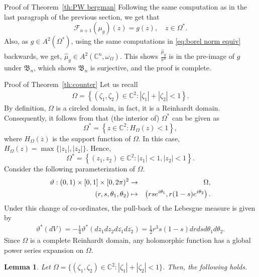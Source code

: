 \documentclass[11pt, oneside, reqno]{amsart}
\numberwithin{equation}{section}
\newtheorem{lemma}[theorem]{Lemma}
\theoremstyle{definition}
\newcommand{\beas}{\begin{eqnarray*}}
\newcommand{\eeas}{\end{eqnarray*}}
\newcommand{\be} {\begin{equation}}
\newcommand{\ee} {\end{equation}}
\newcommand{\bea} {\begin{eqnarray}}
\newcommand{\eea} {\end{eqnarray}}
\newcommand{\C}{\mathbb C}
\newcommand{\N}{\mathbb N}
\newcommand{\F}{\mathcal F}
\newcommand{\ltt}{\left(}
\newcommand{\rtt}{\right)}
\newcommand{\Om}{\Omega}
\begin{document}
{\begin{section}{Proof of Theorem~\ref{th:PW bergman}}
 Following the same computation as in the last paragraph of the previous section, we get that
 \[
 \F_{n+1}(\mu_g)(z)=g(z),\quad z\in \Om^*.
 \]
Also, as $g\in A^2(\Om^*)$, using the same computations in \eqref{eq:borel norm equiv} backwards, we get, $\widehat \mu_g\in A^2(\C^n,\omega_\Om)$. This shows $\frac{\widehat \mu_g}{\pi^n}$ is in the pre-image of $g$ under $\mathfrak B_n$, which shows $\mathfrak B_n$ is surjective, and the proof is complete.   
\end{section}
\begin{section}{Proof of Theorem~\ref{th:counter}}
{
Let us recall \beas
\Om=\left\{(\zeta_1,\zeta_2)\in\C^2: |\zeta_1|+|\zeta_2|<1\right\}.
\eeas
By definition, $\Om$ is a circled domain, in fact, it is a Reinhardt domain. Consequently, it follows from \cite[Proposition~18]{Li02} that (the interior of) $\Om^*$ can be given as }
   \[
   \Om^*=\left\{z\in\C^2: H_\Om(z)<1\right\},
   \]
   {where $H_\Om(\overline z)$ is the support function of $\Om$.} In this case, $H_\Om(z)=\max\{|z_1|,|z_2|\}$. Hence,
$$\Om^*=\left\{\ltt z_1,z_2\rtt\in\C^2: |z_1|<1,|z_2|<1\right\}.$$
Consider the following parameterization of $\Om$. 
\bea
\vartheta:(0,1)\times[0,1]\times [0,2\pi)^2&\rightarrow& \Om,\notag \\
      (r,s,\theta_1,\theta_2)&\mapsto&\ltt rse^{i\theta_1},r(1-s)e^{i\theta_2}\rtt.
      \label{eq:param of diamond}
      \eea
      Under this change of co-ordinates, the pull-back of the Lebesgue measure is given by
      \bea\label{eq:pullback of lbge}
      \vartheta^*\ltt dV\rtt=-\frac{1}{4}\vartheta^*\ltt dz_1 dz_2 d\overline{z_1} d\overline{z_2}\rtt=\frac{1}{2}r^3s(1-s) dr ds d\theta_1 d\theta_2.
      \eea
    Since $\Om$ is a complete Reinhardt domain, any holomorphic function has a global power series expansion on $\Om$. 
    \begin{lemma}\label{le:power series}
Let $\Om=\{(\zeta_1,\zeta_2)\in\C^2: |\zeta_1|+|\zeta_2|<1\}$.  
Then, the following holds.
\end{lemma}
\end{section}}
\end{document}
